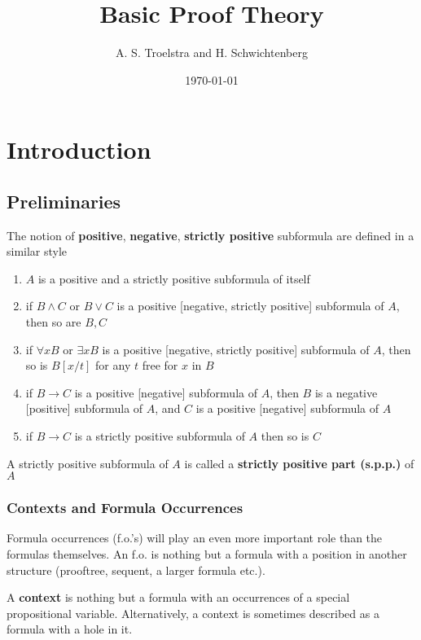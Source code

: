 \documentclass[11pt]{article}
\author{A. S. Troelstra and H. Schwichtenberg}
\date{\today}
\title{Basic Proof Theory}
\begin{document}
\maketitle
\tableofcontents \clearpage
\section{Introduction}
\label{sec:org23a65c4}
\subsection{Preliminaries}
\label{sec:org9307095}
\begin{definition}[]
The notion of \textbf{positive}, \textbf{negative}, \textbf{strictly positive} subformula are defined
in a similar style
\begin{enumerate}
\item \(A\) is a positive and a strictly positive subformula of itself
\item if \(B\wedge C\) or \(B\vee C\) is a positive [negative, strictly positive]
subformula of \(A\), then so are \(B,C\)
\item if \(\forall xB\) or \(\exists xB\) is a positive [negative, strictly
positive] subformula of \(A\), then so is \(B[x/t]\) for any \(t\) free for \(x\)
in \(B\)
\item if \(B\to C\) is a positive [negative] subformula of \(A\), then \(B\) is a
negative [positive] subformula of \(A\), and \(C\) is a positive [negative]
subformula of \(A\)
\item if \(B\to C\) is a strictly positive subformula of \(A\) then so is \(C\)
\end{enumerate}


A strictly positive subformula of \(A\) is called a \textbf{strictly positive part
(s.p.p.)} of \(A\)
\end{definition}
\subsubsection{Contexts and Formula Occurrences}
\label{sec:org1fbf14a}
Formula occurrences (f.o.'s) will play an even more important role than the
formulas themselves. An f.o. is nothing but a formula with a position in
another structure (prooftree, sequent, a larger formula etc.).

A \textbf{context} is nothing but a formula with an occurrences of a special
propositional variable. Alternatively, a context is sometimes described as a
formula with a hole in it. 
\end{document}

